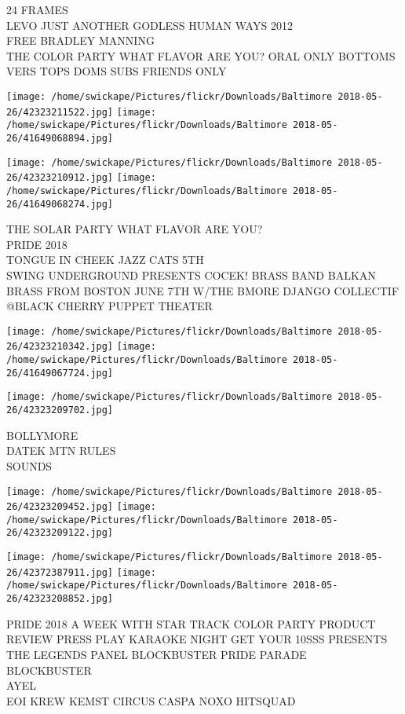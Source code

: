 \documentclass[10pt,letterpaper]{article}
\begin{document}
24 FRAMES\\
LEVO JUST ANOTHER GODLESS HUMAN WAYS 2012\\
FREE BRADLEY MANNING\\
THE COLOR PARTY WHAT FLAVOR ARE YOU?  ORAL ONLY BOTTOMS VERS TOPS DOMS SUBS FRIENDS ONLY\\
\pagebreak

\texttt{[image: /home/swickape/Pictures/flickr/Downloads/Baltimore 2018-05-26/42323211522.jpg]}
\texttt{[image: /home/swickape/Pictures/flickr/Downloads/Baltimore 2018-05-26/41649068894.jpg]}

\texttt{[image: /home/swickape/Pictures/flickr/Downloads/Baltimore 2018-05-26/42323210912.jpg]}
\texttt{[image: /home/swickape/Pictures/flickr/Downloads/Baltimore 2018-05-26/41649068274.jpg]}

THE SOLAR PARTY WHAT FLAVOR ARE YOU?\\
PRIDE 2018\\
TONGUE IN CHEEK JAZZ CATS 5TH\\
SWING UNDERGROUND PRESENTS COCEK!  BRASS BAND BALKAN BRASS FROM BOSTON JUNE 7TH W/THE BMORE DJANGO COLLECTIF @BLACK CHERRY PUPPET THEATER\\
\pagebreak

\texttt{[image: /home/swickape/Pictures/flickr/Downloads/Baltimore 2018-05-26/42323210342.jpg]}
\texttt{[image: /home/swickape/Pictures/flickr/Downloads/Baltimore 2018-05-26/41649067724.jpg]}

\vspace{0.25in}
\texttt{[image: /home/swickape/Pictures/flickr/Downloads/Baltimore 2018-05-26/42323209702.jpg]}

BOLLYMORE\\
DATEK MTN RULES\\
SOUNDS\\
\pagebreak

\texttt{[image: /home/swickape/Pictures/flickr/Downloads/Baltimore 2018-05-26/42323209452.jpg]}
\texttt{[image: /home/swickape/Pictures/flickr/Downloads/Baltimore 2018-05-26/42323209122.jpg]}

\texttt{[image: /home/swickape/Pictures/flickr/Downloads/Baltimore 2018-05-26/42372387911.jpg]}
\texttt{[image: /home/swickape/Pictures/flickr/Downloads/Baltimore 2018-05-26/42323208852.jpg]}

PRIDE 2018 A WEEK WITH STAR TRACK COLOR PARTY PRODUCT REVIEW PRESS PLAY KARAOKE NIGHT GET YOUR 10SSS PRESENTS THE LEGENDS PANEL BLOCKBUSTER PRIDE PARADE\\
BLOCKBUSTER\\
AYEL\\
EOI KREW KEMST CIRCUS CASPA NOXO HITSQUAD\\
\pagebreak
\end{document}
